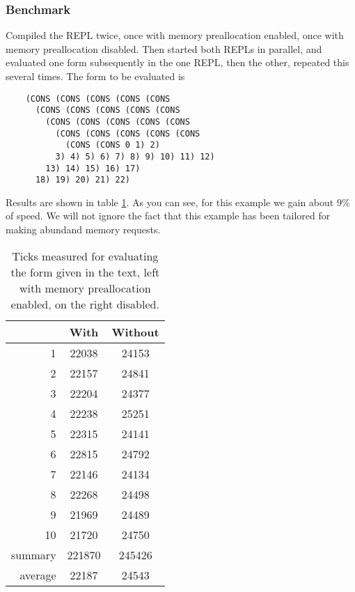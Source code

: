 \documentclass[12pt]{article}
\begin{document}
\subsubsection{Benchmark}


Compiled the REPL twice, once with memory preallocation enabled, once with
memory preallocation disabled.
Then started both REPLs in parallel, and evaluated one form subsequently in the
one REPL, then the other, repeated this several times.
The form to be evaluated is

\begin{verbatim}
    (CONS (CONS (CONS (CONS (CONS 
      (CONS (CONS (CONS (CONS (CONS 
        (CONS (CONS (CONS (CONS (CONS 
          (CONS (CONS (CONS (CONS (CONS 
            (CONS (CONS 0 1) 2)
          3) 4) 5) 6) 7) 8) 9) 10) 11) 12) 
        13) 14) 15) 16) 17) 
      18) 19) 20) 21) 22)
\end{verbatim}

Results are shown in table \ref{tbl:BMResultsMemPreallocation}.
As you can see, for this example we gain about 9\% of speed.
We will not ignore the fact that this example has been tailored for making
abundand memory requests.

\begin{table}
    \centering
    \begin{tabular}{r|c|c}
           & With  & Without \\
        \hline 
         1 & 22038 & 24153 \\
         2 & 22157 & 24841 \\
         3 & 22204 & 24377 \\
         4 & 22238 & 25251 \\
         5 & 22315 & 24141 \\
         6 & 22815 & 24792 \\
         7 & 22146 & 24134 \\
         8 & 22268 & 24498 \\
         9 & 21969 & 24489 \\
        10 & 21720 & 24750 \\
        \hline
        summary & 221870 & 245426 \\
        \hline
        average & 22187  & 24543
    \end{tabular}
    \caption{\label{tbl:BMResultsMemPreallocation} Ticks measured for evaluating
        the form given in the text, left with memory preallocation enabled, on
    the right disabled.}
\end{table}
\end{document}
